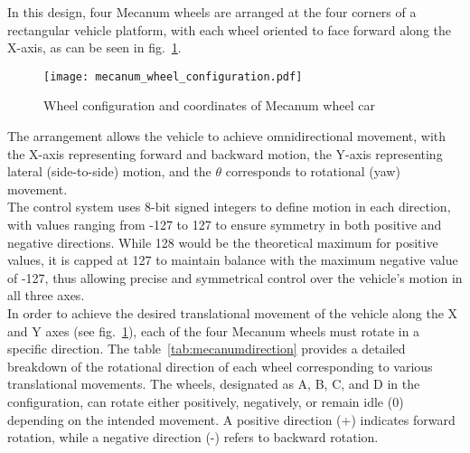 In this design, four Mecanum wheels are arranged at the four corners of a rectangular vehicle platform, with each wheel oriented to face forward along the X-axis, as can be seen in fig.~\ref{fig:mecanumwheelconfig}. 
\begin{figure}[h]
	\centering
	\captionsetup{justification=centering}
	\texttt{[image: mecanum\_wheel\_configuration.pdf]}
	\caption{Wheel configuration and coordinates of Mecanum wheel car~\cite{Dickerson.1991}}
	\label{fig:mecanumwheelconfig}
\end{figure}
The arrangement allows the vehicle to achieve omnidirectional movement, with the X-axis representing forward and backward motion, the Y-axis representing lateral (side-to-side) motion, and the $\theta$ corresponds to rotational (yaw) movement.\\ The control system uses 8-bit signed integers to define motion in each direction, with values ranging from -127 to 127 to ensure symmetry in both positive and negative directions. While 128 would be the theoretical maximum for positive values, it is capped at 127 to maintain balance with the maximum negative value of -127, thus allowing precise and symmetrical control over the vehicle’s motion in all three axes.\\
In order to achieve the desired translational movement of the vehicle along the X and Y axes (see fig.~\ref{fig:mecanumwheelconfig}), each of the four Mecanum wheels must rotate in a specific direction. The table~\ref{tab:mecanumdirection} provides a detailed breakdown of the rotational direction of each wheel corresponding to various translational movements. The wheels, designated as A, B, C, and D in the configuration, can rotate either positively, negatively, or remain idle (0) depending on the intended movement. A positive direction (+) indicates forward rotation, while a negative direction (-) refers to backward rotation. 

